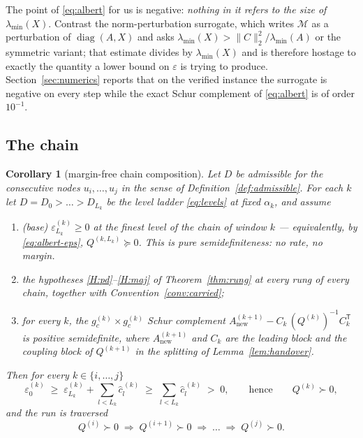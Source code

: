 \documentclass[11pt,a4paper]{article}
\theoremstyle{plain}
\newtheorem{corollary}[theorem]{Corollary}
\theoremstyle{definition}
\newcommand{\T}{\mathsf{T}}
\newcommand{\lmin}{\lambda_{\min}}
\newcommand{\PSD}{\succeq 0}
\newcommand{\PD}{\succ 0}
\DeclareMathOperator{\diag}{diag}
\begin{document}
The point of \eqref{eq:albert} for us is negative: \emph{nothing in it refers to the
size of $\lmin(X)$}. Contrast the norm-perturbation surrogate, which writes
$\mathcal M$ as a perturbation of $\diag(A,X)$ and asks
$\lmin(X)>\|C\|_{2}^{2}/\lmin(A)$ or the symmetric variant; that estimate divides by
$\lmin(X)$ and is therefore hostage to exactly the quantity a lower bound on
$\varepsilon$ is trying to produce. Section~\ref{sec:numerics} reports that on the
verified instance the surrogate is negative on every step while the exact Schur
complement of \eqref{eq:albert} is of order $10^{-1}$.

\subsection{The chain}

\begin{corollary}[margin-free chain composition]
\label{cor:chain}
Let $D$ be admissible for the consecutive nodes $u_{i},\dots,u_{j}$ in the sense of
Definition~\ref{def:admissible}. For each $k$ let $D=D_{0}>\dots>D_{L_{k}}$ be the
level ladder \eqref{eq:levels} at fixed $\alpha_{k}$, and assume
\begin{enumerate}[label=\textup{(A\arabic*)},leftmargin=3.2em]
\item\label{A:base} \textup{(base)} $\varepsilon^{(k)}_{L_{k}}\ge0$ at the finest
      level of the chain of window $k$ --- equivalently, by \eqref{eq:albert-eps},
      $Q^{(k,L_{k})}\PSD$. This is pure semidefiniteness: no rate, no margin.
\item\label{A:hyp} the hypotheses \ref{H:pd}--\ref{H:maj} of Theorem~\ref{thm:rung}
      at every rung of every chain, together with Convention~\ref{conv:carried};
\item\label{A:step} for every $k$, the $g_{c}^{(k)}\times g_{c}^{(k)}$ Schur
      complement $A^{(k+1)}_{\mathrm{new}}-C_{k}\,(Q^{(k)})^{-1}C_{k}^{\T}$ is
      positive semidefinite, where $A^{(k+1)}_{\mathrm{new}}$ and $C_{k}$ are the
      leading block and the coupling block of $Q^{(k+1)}$ in the splitting of
      Lemma~\ref{lem:handover}.
\end{enumerate}
Then for every $k\in\{i,\dots,j\}$
\begin{equation}
\label{eq:chain-eps}
  \varepsilon^{(k)}_{0}
  \;\ge\;\varepsilon^{(k)}_{L_{k}}+\sum_{l<L_{k}}\widehat c^{\,(k)}_{l}
  \;\ge\;\sum_{l<L_{k}}\widehat c^{\,(k)}_{l}\;>\;0,
  \qquad\text{hence}\qquad Q^{(k)}\PD ,
\end{equation}
and the run is traversed
\begin{equation}
\label{eq:chain}
  Q^{(i)}\PD\;\Longrightarrow\;Q^{(i+1)}\PD\;\Longrightarrow\;\dots\;
  \Longrightarrow\;Q^{(j)}\PD .
\end{equation}
\end{corollary}
\end{document}
